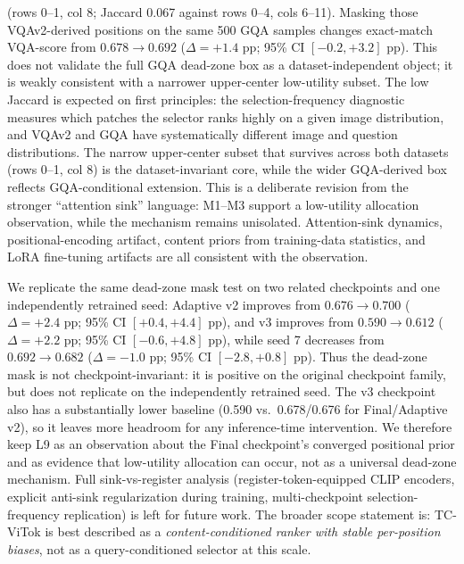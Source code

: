 \documentclass{article}
\begin{document}
(rows 0--1, col 8; Jaccard 0.067 against rows 0--4, cols 6--11). Masking those
VQAv2-derived positions on the same 500 GQA samples changes exact-match
VQA-score from $0.678 \to 0.692$ ($\Delta{=}{+}1.4$ pp; 95\% CI
$[-0.2,{+3.2}]$ pp). This does not validate the full GQA dead-zone box as a
dataset-independent object; it is weakly consistent with a narrower
upper-center low-utility subset.
The low Jaccard is expected on first principles: the selection-frequency
diagnostic measures which patches the selector ranks highly on a given image
distribution, and VQAv2 and GQA have systematically different image and
question distributions. The narrow upper-center subset that survives across
both datasets (rows 0--1, col 8) is the dataset-invariant core, while the wider
GQA-derived box reflects GQA-conditional extension.
This is a deliberate revision from the stronger ``attention sink'' language:
M1--M3 support a low-utility allocation observation, while the mechanism remains
unisolated. Attention-sink dynamics, positional-encoding artifact, content
priors from training-data statistics, and LoRA fine-tuning artifacts are all
consistent with the observation.

We replicate the same dead-zone mask test on two related checkpoints and one
independently retrained seed:
Adaptive v2 improves from $0.676 \to 0.700$ ($\Delta{=}{+}2.4$ pp;
95\% CI $[{+0.4},{+4.4}]$ pp), and v3 improves from $0.590 \to 0.612$
($\Delta{=}{+}2.2$ pp; 95\% CI $[-0.6,{+4.8}]$ pp), while seed 7 decreases
from $0.692 \to 0.682$ ($\Delta{=}{-}1.0$ pp; 95\% CI $[-2.8,{+0.8}]$ pp).
Thus the dead-zone mask is not checkpoint-invariant: it is positive on the
original checkpoint family, but does not replicate on the independently
retrained seed. The v3 checkpoint also has a substantially lower baseline
(0.590 vs.\ 0.678/0.676 for Final/Adaptive v2), so it leaves more headroom for
any inference-time intervention. We therefore keep L9 as an observation about
the Final checkpoint's converged positional prior and as evidence that
low-utility allocation can occur, not as a universal dead-zone mechanism.
Full sink-vs-register
analysis (register-token-equipped CLIP encoders, explicit anti-sink
regularization during training, multi-checkpoint selection-frequency
replication) is left for future work. The broader scope
statement is: TC-ViTok is best described as a \emph{content-conditioned
ranker with stable per-position biases}, not as a query-conditioned
selector at this scale.

\end{document}

